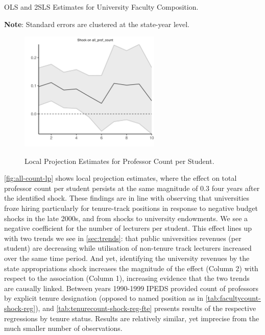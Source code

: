 \documentclass[notitlepage,12pt]{article}
\begin{document}
\begin{table}[!h]
    \singlespacing
    \centering
    \caption{OLS and 2SLS Estimates for University Faculty Composition.}
    \makebox[\textwidth][c]{}
    \begin{flushleft}
        \footnotesize
        \textbf{Note}: Standard errors are clustered at the state-year level.
    \end{flushleft}
    \label{tab:facultycount-shock-reg}
\end{table}

\begin{figure}[h!]
    \centering
    \singlespacing
    \caption{Local Projection Estimates for Professor Count per Student.}
    \includegraphics[width=0.6\textwidth]{figures/all-count-lp.png}
    \label{fig:all-count-lp}
\end{figure}
\autoref{fig:all-count-lp} shows local projection estimates, where the effect on total professor count per student persists at the same magnitude of 0.3 four years after the identified shock.
These findings are in line with \cite{turner2014impact} observing that universities froze hiring particularly for tenure-track positions in response to negative budget shocks in the late 2000s, and \cite{brown2014endowment} from shocks to university endowments.
We see a negative coefficient for the number of lecturers per student.
This effect lines up with two trends we see in \autoref{sec:trends}: that public universities revenues (per student) are decreasing while utilisation of non-tenure track lecturers increased over the same time period.
And yet, identifying the university revenues by the state appropriations shock increases the magnitude of the effect (Column 2) with respect to the association (Column 1), increasing evidence that the two trends are causally linked.
Between years 1990-1999 IPEDS provided count of professors by explicit tenure designation (opposed to named position as in \autoref{tab:facultycount-shock-reg}), and \autoref{tab:tenurecount-shock-reg-fte} presents results of the respective regressions by tenure status.
Results are relatively similar, yet imprecise from the much smaller number of observations.
\end{document}
